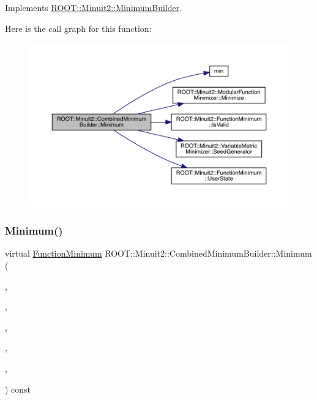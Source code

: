 Implements \mbox{\hyperlink{classROOT_1_1Minuit2_1_1MinimumBuilder_aefaa624436afa8195af1f3393a35981f}{R\+O\+O\+T\+::\+Minuit2\+::\+Minimum\+Builder}}.

Here is the call graph for this function\+:
\nopagebreak
\begin{figure}[H]
\begin{center}
\leavevmode
\includegraphics[width=350pt]{d9/d31/classROOT_1_1Minuit2_1_1CombinedMinimumBuilder_a44282b6271b536b7fc6b80af16ac67ef_cgraph}
\end{center}
\end{figure}
\mbox{\label{classROOT_1_1Minuit2_1_1CombinedMinimumBuilder_a5439a04b01ff94a8f790443b867d6e53}} 
\subsubsection{\texorpdfstring{Minimum()}{Minimum()}\hspace{0.1cm}{\footnotesize\ttfamily [2/3]}}
{\footnotesize\ttfamily virtual \mbox{\hyperlink{classROOT_1_1Minuit2_1_1FunctionMinimum}{Function\+Minimum}} R\+O\+O\+T\+::\+Minuit2\+::\+Combined\+Minimum\+Builder\+::\+Minimum (\begin{DoxyParamCaption}\item[{const \mbox{\hyperlink{classROOT_1_1Minuit2_1_1MnFcn}{Mn\+Fcn}} \&}]{,  }\item[{const \mbox{\hyperlink{classROOT_1_1Minuit2_1_1GradientCalculator}{Gradient\+Calculator}} \&}]{,  }\item[{const \mbox{\hyperlink{classROOT_1_1Minuit2_1_1MinimumSeed}{Minimum\+Seed}} \&}]{,  }\item[{const \mbox{\hyperlink{classROOT_1_1Minuit2_1_1MnStrategy}{Mn\+Strategy}} \&}]{,  }\item[{unsigned int}]{,  }\item[{double}]{ }\end{DoxyParamCaption}) const\hspace{0.3cm}{\ttfamily [virtual]}}



